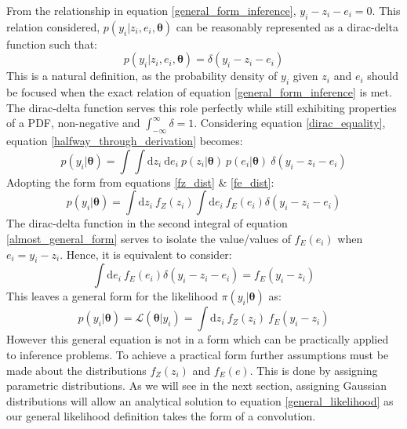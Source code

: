 From the relationship in equation \ref{general_form_inference}, $y_i-z_i-e_i = 0$. This relation considered, $p(y_i|z_i,e_i,\bm{\theta})$ can be reasonably represented as a dirac-delta function such that:
\begin{equation}
p(y_i|z_i,e_i,\bm{\theta}) = \delta(y_i-z_i-e_i)
\label{dirac_equality}
\end{equation}
This is a natural definition, as the probability density of $y_i$ given $z_i$ and $e_i$ should be focused when the exact relation of equation \ref{general_form_inference} is met. The dirac-delta function serves this role perfectly while still exhibiting properties of a PDF, non-negative and $\int_{-\infty}^{\infty}\delta = 1$. Considering equation \ref{dirac_equality}, equation \ref{halfway_through_derivation} becomes:
\begin{equation}
p(y_i|\bm{\theta}) = \int \int \text{d}z_i\ \text{d}e_i\ p(z_i|\bm{\theta})\ p(e_i|\bm{\theta})\ \delta(y_i-z_i-e_i)
\end{equation}
Adopting the form from equations \ref{fz_dist} \& \ref{fe_dist}:
\begin{equation}
p(y_i|\bm{\theta}) = \int \text{d}z_i\ f_Z(z_i) \int \text{d}e_i\ f_E(e_i) \delta(y_i-z_i-e_i)
\label{almost_general_form}
\end{equation}
The dirac-delta function in the second integral of equation \ref{almost_general_form} serves to isolate the value/values of $f_E(e_i)$ when $e_i = y_i - z_i$. Hence, it is equivalent to consider:
\begin{equation}
\int \text{d}e_i\ f_E(e_i) \delta(y_i-z_i-e_i) = f_E(y_i - z_i)
\end{equation}
This leaves a general form for the likelihood $\pi(y_i|\bm{\theta})$ as: 
\begin{equation}
p(y_i|\bm{\theta}) = \mathcal{L}(\bm{\theta}|y_i) = \int \text{d}z_i\ f_Z(z_i)\ f_E(y_i - z_i)
\label{general_likelihood}
\end{equation}
However this general equation is not in a form which can be practically applied to inference problems. To achieve a practical form further assumptions must be made about the distributions $f_Z(z_i)$ and $f_E(e)$. This is done by assigning parametric distributions. As we will see in the next section, assigning Gaussian distributions will allow an analytical solution to equation \ref{general_likelihood} as our general likelihood definition takes the form of a convolution. 

